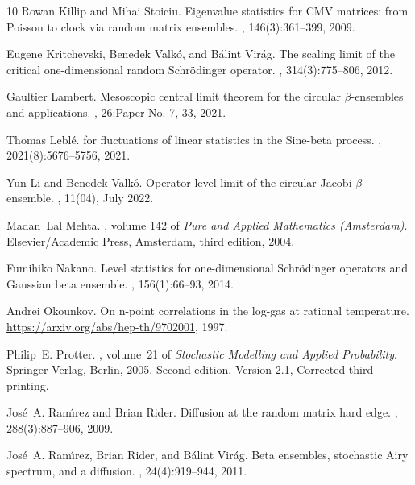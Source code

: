 \documentclass[12pt]{article}
\theoremstyle{definition} %
\theoremstyle{remark} %
\begin{document}
\begin{thebibliography}{10}
Rowan Killip and Mihai Stoiciu.
\newblock Eigenvalue statistics for {CMV} matrices: from {P}oisson to clock via
  random matrix ensembles.
, 146(3):361--399, 2009.

Eugene Kritchevski, Benedek Valk{{\'o}}, and B{{\'a}}lint Vir{{\'a}}g.
\newblock The scaling limit of the critical one-dimensional random
  {S}chr{\"o}dinger operator.
, 314(3):775--806, 2012.

Gaultier Lambert.
\newblock Mesoscopic central limit theorem for the circular {$\beta$}-ensembles
  and applications.
, 26:Paper No. 7, 33, 2021.

Thomas Lebl{\'e}.
 for fluctuations of linear statistics in the {S}ine-beta
  process.
, 2021(8):5676--5756,
  2021.

Yun Li and Benedek Valk{\'o}.
\newblock Operator level limit of the circular {Jacobi} $\beta$-ensemble.
, 11(04), July 2022.

Madan~Lal Mehta.
, volume 142 of {\em Pure and Applied
  Mathematics (Amsterdam)}.
\newblock Elsevier/Academic Press, Amsterdam, third edition, 2004.

Fumihiko Nakano.
\newblock Level statistics for one-dimensional {S}chr{\"o}dinger operators and
  {G}aussian beta ensemble.
, 156(1):66--93, 2014.

Andrei Okounkov.
\newblock On n-point correlations in the log-gas at rational temperature.
\newblock \url{https://arxiv.org/abs/hep-th/9702001}, 1997.

Philip~E. Protter.
, volume~21 of
  {\em Stochastic Modelling and Applied Probability}.
\newblock Springer-Verlag, Berlin, 2005.
\newblock Second edition. Version 2.1, Corrected third printing.

Jos{{\'e}}~A. Ram{\'{\i}}rez and Brian Rider.
\newblock Diffusion at the random matrix hard edge.
, 288(3):887--906, 2009.

Jos{{\'e}}~A. Ram{\'{\i}}rez, Brian Rider, and B{{\'a}}lint Vir{{\'a}}g.
\newblock Beta ensembles, stochastic {A}iry spectrum, and a diffusion.
, 24(4):919--944, 2011.


\end{thebibliography}
\end{document}
